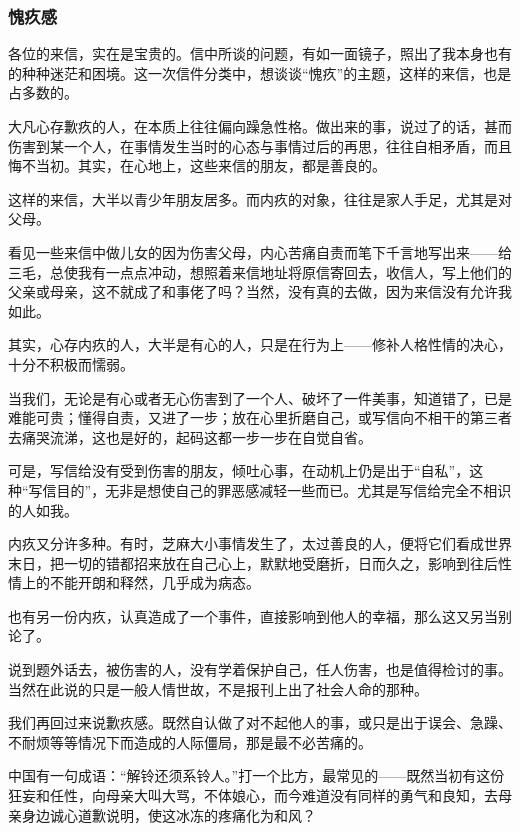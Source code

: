 \subsubsection{愧疚感}

\par {}
\par 各位的来信，实在是宝贵的。信中所谈的问题，有如一面镜子，照出了我本身也有的种种迷茫和困境。这一次信件分类中，想谈谈“愧疚”的主题，这样的来信，也是占多数的。
\par 大凡心存歉疚的人，在本质上往往偏向躁急性格。做出来的事，说过了的话，甚而伤害到某一个人，在事情发生当时的心态与事情过后的再思，往往自相矛盾，而且悔不当初。其实，在心地上，这些来信的朋友，都是善良的。
\par 这样的来信，大半以青少年朋友居多。而内疚的对象，往往是家人手足，尤其是对父母。
\par 看见一些来信中做儿女的因为伤害父母，内心苦痛自责而笔下千言地写出来——给三毛，总使我有一点点冲动，想照着来信地址将原信寄回去，收信人，写上他们的父亲或母亲，这不就成了和事佬了吗？当然，没有真的去做，因为来信没有允许我如此。
\par 其实，心存内疚的人，大半是有心的人，只是在行为上——修补人格性情的决心，十分不积极而懦弱。
\par 当我们，无论是有心或者无心伤害到了一个人、破坏了一件美事，知道错了，已是难能可贵；懂得自责，又进了一步；放在心里折磨自己，或写信向不相干的第三者去痛哭流涕，这也是好的，起码这都一步一步在自觉自省。
\par 可是，写信给没有受到伤害的朋友，倾吐心事，在动机上仍是出于“自私”，这种“写信目的”，无非是想使自己的罪恶感减轻一些而已。尤其是写信给完全不相识的人如我。
\par 内疚又分许多种。有时，芝麻大小事情发生了，太过善良的人，便将它们看成世界末日，把一切的错都招来放在自己心上，默默地受磨折，日而久之，影响到往后性情上的不能开朗和释然，几乎成为病态。
\par 也有另一份内疚，认真造成了一个事件，直接影响到他人的幸福，那么这又另当别论了。
\par 说到题外话去，被伤害的人，没有学着保护自己，任人伤害，也是值得检讨的事。当然在此说的只是一般人情世故，不是报刊上出了社会人命的那种。
\par 我们再回过来说歉疚感。既然自认做了对不起他人的事，或只是出于误会、急躁、不耐烦等等情况下而造成的人际僵局，那是最不必苦痛的。
\par 中国有一句成语：“解铃还须系铃人。”打一个比方，最常见的——既然当初有这份狂妄和任性，向母亲大叫大骂，不体娘心，而今难道没有同样的勇气和良知，去母亲身边诚心道歉说明，使这冰冻的疼痛化为和风？
